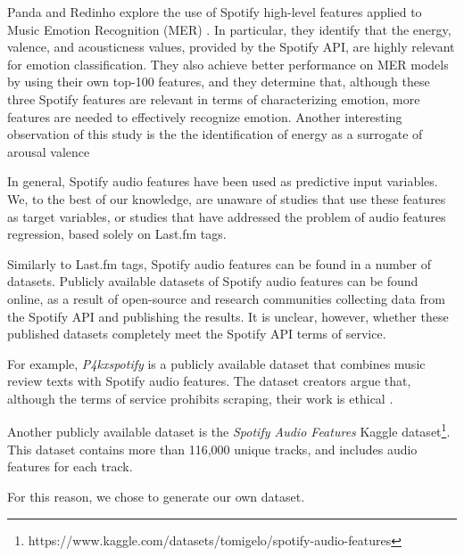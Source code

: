 \documentclass[sn-mathphys]{sn-jnl}%
\theoremstyle{thmstyleone}%
\theoremstyle{thmstyletwo}%
\theoremstyle{thmstylethree}%
\begin{document}
Panda and Redinho explore the use of Spotify high-level features applied to Music Emotion Recognition (MER) \cite{panda2021does}.
In particular, they identify that the energy, valence, and acousticness values, provided by the Spotify API,
are highly relevant for emotion classification.
They also achieve better performance on MER models by using their own top-100 features, and they determine that,
although these three Spotify features are relevant in terms of characterizing emotion,
more features are needed to effectively recognize emotion.
Another interesting observation of this study is the the identification of energy as a surrogate of arousal valence


In general, Spotify audio features have been used as predictive input variables.
We, to the best of our knowledge, are unaware of studies that use these features as target variables,
or studies that have addressed the problem of audio features regression, based solely on Last.fm tags.


Similarly to Last.fm tags, Spotify audio features can be found in a number of datasets.
Publicly available datasets of Spotify audio features can be found online,
as a result of open-source and research communities collecting data from the Spotify API and publishing the results.
It is unclear, however, whether these published datasets completely meet the Spotify API terms of service.

For example, \emph{P4kxspotify} is a publicly available dataset that combines music review texts with Spotify audio features.
The dataset creators argue that, although the terms of service prohibits scraping, their work is ethical \cite{pinter2020p4kxspotify}.




Another publicly available dataset is the \emph{Spotify Audio Features} Kaggle dataset\footnote[4]{https://www.kaggle.com/datasets/tomigelo/spotify-audio-features}.
This dataset contains more than 116,000 unique tracks, and includes audio features for each track.

For this reason, we chose to generate our own dataset.



\end{document}
